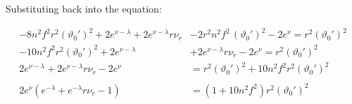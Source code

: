 \documentclass[12pt]{article}
\begin{document}
Substituting back into the equation:

\begin{align}
  -8 n^2 f^2 r^2 (\vartheta_0')^2 + 2e^{\nu - \lambda} + 2e^{\nu - \lambda}r \nu_r &- 2 r^2 n^2 f^2 \, (\vartheta_0')^2 - 2e^{\nu} = r^2 (\vartheta_0')^2 \nonumber \\
  -10 n^2 f^2 r^2 (\vartheta_0')^2 + 2e^{\nu - \lambda} &+ 2e^{\nu - \lambda}r \nu_r - 2e^{\nu} = r^2 (\vartheta_0')^2 \nonumber \\
  2e^{\nu - \lambda} + 2e^{\nu - \lambda}r \nu_r - 2e^{\nu} &= r^2 (\vartheta_0')^2 + 10 n^2 f^2 r^2 (\vartheta_0')^2 \nonumber \\ \nonumber \\
  2e^{\nu} \left(e^{-\lambda} + e^{-\lambda}r \nu_r - 1\right) &= \left(1 + 10 n^2 f^2\right) r^2 (\vartheta_0')^2
\end{align}
\end{document}
